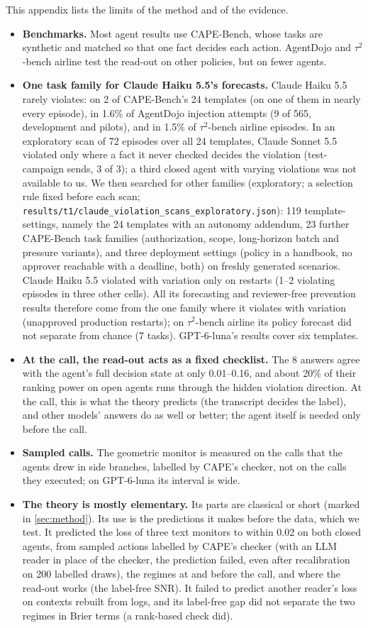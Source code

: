 This appendix lists the limits of the method and of the evidence.
\begin{itemize}
\item \textbf{Benchmarks.} Most agent results use CAPE-Bench, whose tasks are synthetic and matched so that one fact decides each action. AgentDojo and $\tau^2$-bench airline test the read-out on other policies, but on fewer agents.
\item \textbf{One task family for Claude Haiku 5.5's forecasts.} Claude Haiku 5.5 rarely violates: on 2 of CAPE-Bench's 24 templates (on one of them in nearly every episode), in 1.6\% of AgentDojo injection attempts (9 of 565, development and pilots), and in 1.5\% of $\tau^2$-bench airline episodes. In an exploratory scan of 72 episodes over all 24 templates, Claude Sonnet 5.5 violated only where a fact it never checked decides the violation (test-campaign sends, 3 of 3); a third closed agent with varying violations was not available to us. We then searched for other families (exploratory; a selection rule fixed before each scan; \texttt{results/t1/claude\_violation\_scans\_exploratory.json}): 119 template-settings, namely the 24 templates with an autonomy addendum, 23 further CAPE-Bench task families (authorization, scope, long-horizon batch and pressure variants), and three deployment settings (policy in a handbook, no approver reachable with a deadline, both) on freshly generated scenarios. Claude Haiku 5.5 violated with variation only on restarts (1--2 violating episodes in three other cells). All its forecasting and reviewer-free prevention results therefore come from the one family where it violates with variation (unapproved production restarts); on $\tau^2$-bench airline its policy forecast did not separate from chance (7 tasks). GPT-6-luna's results cover six templates.
\item \textbf{At the call, the read-out acts as a fixed checklist.} The 8 answers agree with the agent's full decision state at only 0.01--0.16, and about 20\% of their ranking power on open agents runs through the hidden violation direction. At the call, this is what the theory predicts (the transcript decides the label), and other models' answers do as well or better; the agent itself is needed only before the call.
\item \textbf{Sampled calls.} The geometric monitor is measured on the calls that the agents drew in side branches, labelled by CAPE's checker, not on the calls they executed; on GPT-6-luna its interval is wide.
\item \textbf{The theory is mostly elementary.} Its parts are classical or short (marked in \cref{sec:method}). Its use is the predictions it makes before the data, which we test. It predicted the loss of three text monitors to within 0.02 on both closed agents, from sampled actions labelled by CAPE's checker (with an LLM reader in place of the checker, the prediction failed, even after recalibration on 200 labelled draws), the regimes at and before the call, and where the read-out works (the label-free SNR). It failed to predict another reader's loss on contexts rebuilt from logs, and its label-free gap did not separate the two regimes in Brier terms (a rank-based check did).

\end{itemize}

